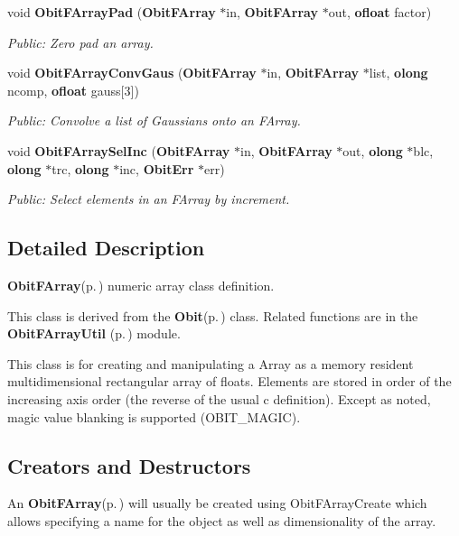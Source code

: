 \begin{CompactItemize}
void {\bf Obit\-FArray\-Pad} ({\bf Obit\-FArray} $\ast$in, {\bf Obit\-FArray} $\ast$out, {\bf ofloat} factor)
\begin{CompactList}\small\item\em Public: Zero pad an array. \item\end{CompactList}\item 
void {\bf Obit\-FArray\-Conv\-Gaus} ({\bf Obit\-FArray} $\ast$in, {\bf Obit\-FArray} $\ast$list, {\bf olong} ncomp, {\bf ofloat} gauss[3])
\begin{CompactList}\small\item\em Public: Convolve a list of Gaussians onto an FArray. \item\end{CompactList}\item 
void {\bf Obit\-FArray\-Sel\-Inc} ({\bf Obit\-FArray} $\ast$in, {\bf Obit\-FArray} $\ast$out, {\bf olong} $\ast$blc, {\bf olong} $\ast$trc, {\bf olong} $\ast$inc, {\bf Obit\-Err} $\ast$err)
\begin{CompactList}\small\item\em Public: Select elements in an FArray by increment. \item\end{CompactList}\end{CompactItemize}


\subsection{Detailed Description}
{\bf Obit\-FArray}{\rm (p.\,\pageref{structObitFArray})} numeric array class definition. 

This class is derived from the {\bf Obit}{\rm (p.\,\pageref{structObit})} class. Related functions are in the {\bf Obit\-FArray\-Util }{\rm (p.\,\pageref{ObitFArrayUtil_8h})} module.

This class is for creating and manipulating a Array as a memory resident multidimensional rectangular array of floats. Elements are stored in order of the increasing axis order (the reverse of the usual c definition). Except as noted, magic value blanking is supported (OBIT\_\-MAGIC).\subsection{Creators and Destructors}\label{ObitFArray_8h_ObitFArrayaccess}
An {\bf Obit\-FArray}{\rm (p.\,\pageref{structObitFArray})} will usually be created using Obit\-FArray\-Create which allows specifying a name for the object as well as dimensionality of the array.

